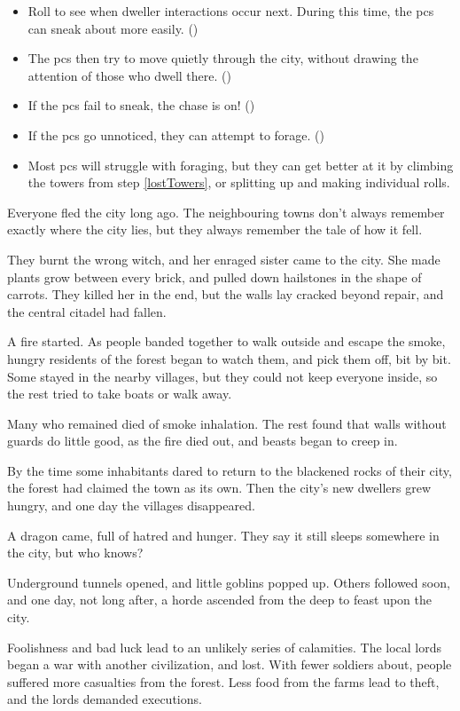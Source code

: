 \begin{multicols}{2}
\begin{itemize}
  \item
  Roll to see when dweller interactions occur next.
  During this time, the \glspl{pc} can sneak about more easily.
  ()
  \item
  The \glspl{pc} then try to move quietly through the city, without drawing the attention of those who dwell there.
  ()
  \item
  If the \glspl{pc} fail to sneak, the chase is on!
  ()
  \item
  If the \glspl{pc} go unnoticed, they can attempt to forage.
  ()
  \item
  Most \glspl{pc} will struggle with foraging, but they can get better at it by climbing the towers from step \ref{lostTowers}, or splitting up and making individual rolls.
\end{itemize}

\label{lostCataclysm}

Everyone fled the city long ago.
The neighbouring towns don't always remember exactly where the city lies, but they always remember the tale of how it fell.

\begin{dlist}
  \item
  They burnt the wrong witch, and her enraged sister came to the city.
  She made plants grow between every brick, and pulled down hailstones in the shape of carrots.
  They killed her in the end, but the walls lay cracked beyond repair, and the central citadel had fallen.
  \item
  A fire started.
  As people banded together to walk outside and escape the smoke, hungry residents of the forest began to watch them, and pick them off, bit by bit.
  Some stayed in the nearby villages, but they could not keep everyone inside, so the rest tried to take boats or walk away.

  Many who remained died of smoke inhalation.
  The rest found that walls without guards do little good, as the fire died out, and beasts began to creep in.

  By the time some inhabitants dared to return to the blackened rocks of their city, the forest had claimed the town as its own.
  Then the city's new dwellers grew hungry, and one day the villages disappeared.
  \item
  A dragon came, full of hatred and hunger.
  They say it still sleeps somewhere in the city, but who knows?
  \item
  Underground tunnels opened, and little goblins popped up.
  Others followed soon, and one day, not long after, a horde ascended from the \gls{deep} to feast upon the city.
  \item
  Foolishness and bad luck lead to an unlikely series of calamities.
  The local lords began a war with another civilization, and lost.
  With fewer soldiers about, people suffered more casualties from the forest.
  Less food from the farms lead to theft, and the lords demanded executions.


\end{dlist}
\end{multicols}
